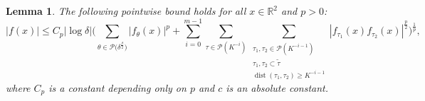 \documentclass[10pt,a4paper]{amsart}
\newcommand{\abs}[1]{\left|{#1}\right|}
\newtheorem{lemma}{Lemma}
\begin{document}
\begin{lemma}\label{br-na}
The following pointwise bound holds for all $x\in\mathbb{R}^2$ and $p>0$:
\begin{equation}\label{br-na:eq1}
    |f(x)| \leq C_p |\log\delta|\bigg(
        \sum_{\theta \in \mathcal{P}\bigl(\delta^{\frac{\beta}{2}}\bigr)} |f_\theta(x)|^p
        + \sum_{i=0}^{m-1} \sum_{\tau \in \mathcal{P}(K^{-i})}
          \sum_{\substack{ \tau_1,\tau_2 \in \mathcal{P}(K^{-i-1}) \\
                          \tau_1,\tau_2 \subset \widetilde{\tau} \\
                          \operatorname{dist}(\tau_1,\tau_2) \geq  K^{-i-1} }}
          \abs{f_{\tau_1}(x)f_{\tau_2}(x)}^{\frac{p}{2}}
    \bigg)^{\frac{1}{p}},
\end{equation}
where $C_p$ is a constant depending only on $p$ and $c$ is an absolute constant.
\end{lemma}
\end{document}
